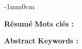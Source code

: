 


\thispagestyle{backcover}
\begin{changemargin}{-1mm}{0cm}
    \begin{minipage}[l]{1.1\columnwidth}
        
        
        {\LARGE\textbf{Résumé}}
        \vskip5mm
            {\large \@frenchAbstract}
        \vskip5mm
        {\large\textbf{Mots clés : }
            \@frenchAbstractKeywords
        }
        
        {
            {\vskip13mm}{\vskip18mm}}
        
        {\LARGE\textbf{Abstract}}
        \vskip5mm
            {\large \@englishAbstract}
        \vskip5mm
        {\large\textbf{Keywords : }
            \@englishAbstractKeywords
        }
    
    \end{minipage}
    


\end{changemargin}